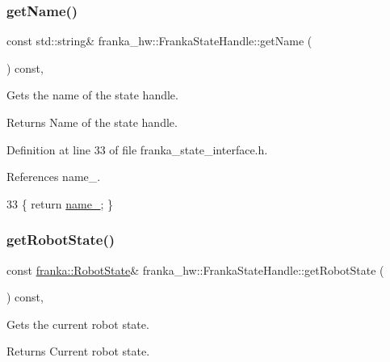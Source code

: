 \subsubsection{\texorpdfstring{get\+Name()}{getName()}}
{\footnotesize\ttfamily const std\+::string\& franka\+\_\+hw\+::\+Franka\+State\+Handle\+::get\+Name (\begin{DoxyParamCaption}{ }\end{DoxyParamCaption}) const\hspace{0.3cm}{\ttfamily [inline]}, {\ttfamily [noexcept]}}

Gets the name of the state handle.

\begin{DoxyReturn}{Returns}
Name of the state handle. 
\end{DoxyReturn}


Definition at line 33 of file franka\+\_\+state\+\_\+interface.\+h.



References name\+\_\+.


\begin{DoxyCode}
33 \{ \textcolor{keywordflow}{return} \hyperlink{classfranka__hw_1_1FrankaStateHandle_a15abdf997d8480501d66250dab2fc6c8}{name\_}; \}
\end{DoxyCode}
\mbox{\label{classfranka__hw_1_1FrankaStateHandle_a6e0be7a9ae6e86394ea273f9a84c11cb}} 
\subsubsection{\texorpdfstring{get\+Robot\+State()}{getRobotState()}}
{\footnotesize\ttfamily const \hyperlink{structfranka_1_1RobotState}{franka\+::\+Robot\+State}\& franka\+\_\+hw\+::\+Franka\+State\+Handle\+::get\+Robot\+State (\begin{DoxyParamCaption}{ }\end{DoxyParamCaption}) const\hspace{0.3cm}{\ttfamily [inline]}, {\ttfamily [noexcept]}}

Gets the current robot state.

\begin{DoxyReturn}{Returns}
Current robot state. 
\end{DoxyReturn}


